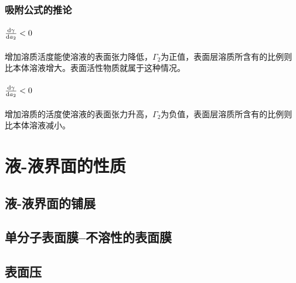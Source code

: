 \subsubsection{吸附公式的推论}

\paragraph{$\frac{\mathrm{d} \gamma}{\mathrm{d} a_2} < 0$} 增加溶质活度能使溶液的表面张力降低，$\Gamma_2$为正值，表面层溶质所含有的比例则比本体溶液增大。表面活性物质就属于这种情况。

\paragraph{$\frac{\mathrm{d} \gamma}{\mathrm{d} a_2} < 0$} 增加溶质的活度使溶液的表面张力升高，$\Gamma_2$为负值，表面层溶质所含有的比例则比本体溶液减小。

\section{液-液界面的性质}

\subsection{液-液界面的铺展}

\subsection{单分子表面膜--不溶性的表面膜}

\subsection{表面压}